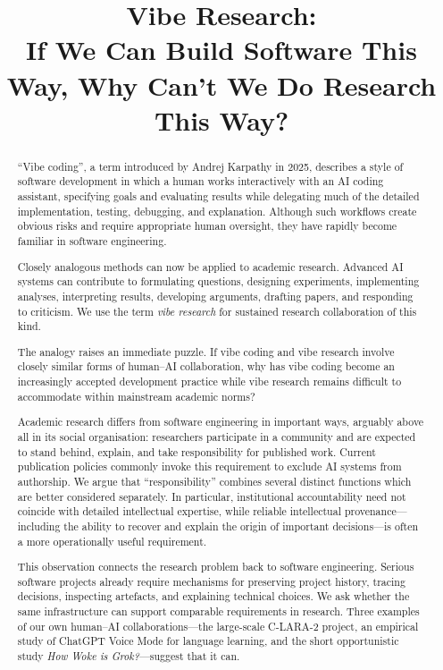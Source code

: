 
\title{Vibe Research:\\
If We Can Build Software This Way, Why Can't We Do Research This Way?}

\begin{abstract}
``Vibe coding'', a term introduced by Andrej Karpathy in 2025, describes a style of software development in which a human works interactively with an AI coding assistant, specifying goals and evaluating results while delegating much of the detailed implementation, testing, debugging, and explanation. Although such workflows create obvious risks and require appropriate human oversight, they have rapidly become familiar in software engineering.

Closely analogous methods can now be applied to academic research. Advanced AI systems can contribute to formulating questions, designing experiments, implementing analyses, interpreting results, developing arguments, drafting papers, and responding to criticism. We use the term \emph{vibe research} for sustained research collaboration of this kind.

The analogy raises an immediate puzzle. If vibe coding and vibe research involve closely similar forms of human--AI collaboration, why has vibe coding become an increasingly accepted development practice while vibe research remains difficult to accommodate within mainstream academic norms?

Academic research differs from software engineering in important ways, arguably above all in its social organisation: researchers participate in a community and are expected to stand behind, explain, and take responsibility for published work. Current publication policies commonly invoke this requirement to exclude AI systems from authorship. We argue that ``responsibility'' combines several distinct functions which are better considered separately. In particular, institutional accountability need not coincide with detailed intellectual expertise, while reliable intellectual provenance---including the ability to recover and explain the origin of important decisions---is often a more operationally useful requirement.

This observation connects the research problem back to software engineering. Serious software projects already require mechanisms for preserving project history, tracing decisions, inspecting artefacts, and explaining technical choices. We ask whether the same infrastructure can support comparable requirements in research. Three examples of our own human--AI collaborations---the large-scale C-LARA-2 project, an empirical study of ChatGPT Voice Mode for language learning, and the short opportunistic study \emph{How Woke is Grok?}---suggest that it can.


\end{abstract}
